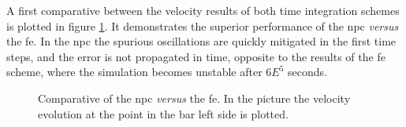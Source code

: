 \documentclass[preprint,12pt,a4paper]{elsarticle}
\begin{document}
A first comparative between the velocity results of both time integration
schemes is plotted in figure \ref{fig:Dyka-NPC-FE}. It demonstrates the
superior performance of the \acrshort{npc} \textit{versus} the \acrshort{fe}. In the \acrshort{npc} the
spurious oscillations are quickly mitigated in the first time steps,
and the error is not propagated in time, opposite to the results of the \acrshort{fe} scheme, where the
simulation becomes unstable after $6E^{5}$ seconds.
\begin{figure}\sidecaption
  \centering
  \caption{Comparative of the \acrshort{npc} \textit{versus} the \acrshort{fe}. In the
    picture the velocity evolution at the point in the bar left side
    is plotted.}
  \label{fig:Dyka-NPC-FE}
\end{figure}
\end{document}
